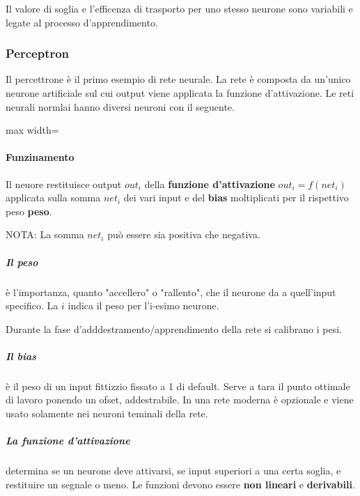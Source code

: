 Il valore di soglia e l'efficenza di trasporto per uno stesso neurone sono variabili e legate al processo d'apprendimento.
\subsubsection{Perceptron}
Il percettrone è il primo esempio di rete neurale. La rete è composta da un'unico neurone artificiale sul cui output viene applicata la funzione d'attivazione.
Le reti neurali normlai hanno diversi neuroni con il seguente.
\begin{center}
	\begin{adjustbox}{max width=\textwidth}
	\end{adjustbox}
\end{center}
\paragraph{Funzinamento} Il neuore restituisce output $out_i$ della \textbf{funzione d'attivazione} $out_i=f(net_i)$ applicata sulla somma $net_i$ dei vari input e del \textbf{bias} moltiplicati per il rispettivo peso \textbf{peso}.

NOTA: La somma $net_i$ può essere sia positiva che negativa.
\subparagraph{Il peso} è l'importanza, quanto "accellero" o "rallento", che il neurone da a quell'input specifico. La $i$ indica il peso per l'i-esimo neurone.

Durante la fase d'adddestramento/apprendimento della rete si calibrano i pesi.
\subparagraph{Il bias} è il peso di un input fittizzio fissato a 1 di default. Serve a tara il punto ottimale di lavoro ponendo un ofset, addestrabile. In una rete moderna è opzionale e viene usato solamente nei neuroni teminali della rete.
\subparagraph{La funzione d'attivazione} determina se un neurone deve attivarsi, se input superiori a una certa soglia, e restituire un segnale o meno.
Le funzioni devono essere \textbf{non lineari} e \textbf{derivabili}.


